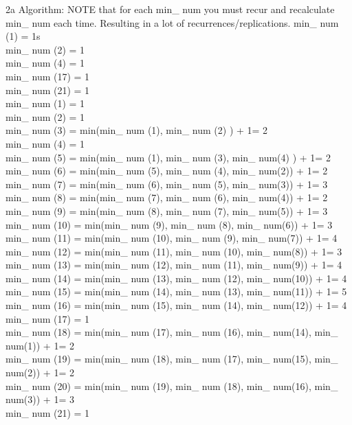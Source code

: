 \documentclass[11pt]{article}
\begin{document}
2a Algorithm: NOTE that for each min\_ num you must recur and recalculate min\_ num each time. Resulting in a lot of recurrences/replications.
min\_ num (1) = 1s\\
min\_ num (2) = 1\\
min\_ num (4) = 1\\
min\_ num (17) = 1\\
min\_ num (21) = 1\\
min\_ num (1) = 1\\
min\_ num (2) = 1\\
min\_ num (3) = min(min\_ num (1), min\_ num (2) ) + 1= 2\\
min\_ num (4) = 1\\
min\_ num (5) = min(min\_ num (1), min\_ num (3), min\_ num(4) ) + 1= 2\\
min\_ num (6) = min(min\_ num (5), min\_ num (4), min\_ num(2)) + 1= 2\\
min\_ num (7) = min(min\_ num (6), min\_ num (5), min\_ num(3)) + 1= 3\\
min\_ num (8) = min(min\_ num (7), min\_ num (6), min\_ num(4)) + 1= 2\\
min\_ num (9) = min(min\_ num (8), min\_ num (7), min\_ num(5)) + 1= 3\\
min\_ num (10) = min(min\_ num (9), min\_ num (8), min\_ num(6)) + 1= 3\\
min\_ num (11) = min(min\_ num (10), min\_ num (9), min\_ num(7)) + 1= 4\\
min\_ num (12) = min(min\_ num (11), min\_ num (10), min\_ num(8)) + 1= 3\\
min\_ num (13) = min(min\_ num (12), min\_ num (11), min\_ num(9)) + 1= 4\\
min\_ num (14) = min(min\_ num (13), min\_ num (12), min\_ num(10)) + 1= 4\\
min\_ num (15) = min(min\_ num (14), min\_ num (13), min\_ num(11)) + 1= 5\\
min\_ num (16) = min(min\_ num (15), min\_ num (14), min\_ num(12)) + 1= 4\\
min\_ num (17) = 1\\
min\_ num (18) = min(min\_ num (17), min\_ num (16), min\_ num(14), min\_ num(1)) + 1= 2\\
min\_ num (19) = min(min\_ num (18), min\_ num (17), min\_ num(15), min\_ num(2)) + 1= 2\\
min\_ num (20) = min(min\_ num (19), min\_ num (18), min\_ num(16), min\_ num(3)) + 1= 3\\
min\_ num (21) = 1\\
\end{document}
